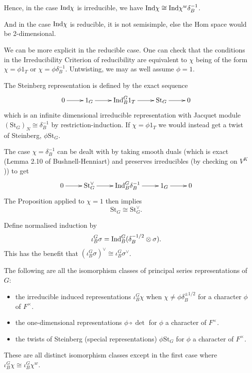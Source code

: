 \begin{rem}
Hence, in the case $\mathrm{Ind} \chi$ is irreducible, we have $\mathrm{Ind} \chi \cong \mathrm{Ind} \chi^w \delta_B^{-1}$.

And in the case $\mathrm{Ind} \chi$ is reducible, it is not semisimple, else the Hom space would be 2-dimensional.
\end{rem}

We can be more explicit in the reducible case. One can check that the conditions in the Irreducibility Criterion of reducibility are equivalent to $\chi$ being of the form $\chi = \phi 1_T$ or $\chi =\phi \delta_B^{-1}$. Untwisting, we may as well assume $\phi=1$.

\begin{defn}
    The Steinberg representation is defined by the exact sequence
    $$\xymatrix{0 \ar[r] & 1_G \ar[r] & \Ind_B^G 1_T \ar[r] & \mathrm{St}_G \ar[r] & 0}$$ which is an infinite dimensional irreducible representation with Jacquet module $(\mathrm{St}_G)_N \cong \delta_B^{-1}$ by restriction-induction. If $\chi =\phi 1_T$ we would instead get a twist of Steinberg, $\phi \mathrm{St}_G$.
\end{defn}

The case $\chi = \delta_B^{-1}$ can be dealt with by taking smooth duals (which is exact (Lemma 2.10 of Bushnell-Henniart) and preserves irreducibles (by checking on $V^K$)) to get 
$$\xymatrix{0 \ar[r] & \mathrm{St}_G^\vee \ar[r] & \Ind_B^G \delta_B^{-1} \ar[r] & 1_G \ar[r] & 0}$$
The Proposition applied to $\chi = 1$ then implies
$$\mathrm{St}_G \cong \mathrm{St}_G^\vee.$$

\begin{notn}
    Define normalised induction by
    $$\iota_B^G \sigma = \mathrm{Ind}_B^G (\delta_B^{-1/2} \otimes \sigma).$$
    This has the benefit that $(\iota_B^G \sigma)^\vee \cong \iota_B^G \sigma^\vee$.
\end{notn}

\begin{thm}
    The following are all the isomorphism classes of principal series representations of $G$:
    \begin{itemize}
        \item the irreducible induced representations $\iota_B^G \chi$ when $\chi \neq \phi \delta_B^{\pm 1/2}$ for a character $\phi$ of $F^\times$.
        \item the one-dimensional representations $\phi \circ \det$ for $\phi$ a character of $F^\times$.
        \item the twists of Steinberg (special representations) $\phi \mathrm{St}_G$ for $\phi$ a character of $F^\times$.
    \end{itemize}
    These are all distinct isomorphism classes except in the first case where $\iota_B^G \chi \cong \iota_B^G \chi^w$.
\end{thm}